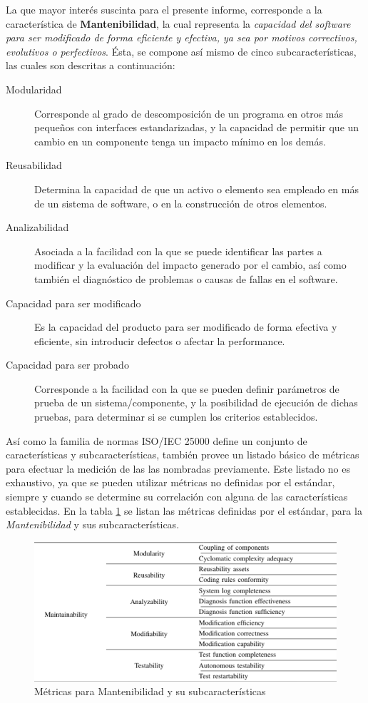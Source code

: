 La que mayor interés suscinta para el presente informe, corresponde a la característica
de \textbf{Mantenibilidad}, la cual representa la \textit{capacidad del software para ser modificado
de forma eficiente y efectiva, ya sea por motivos correctivos, evolutivos o perfectivos}.
Ésta, se compone así mismo de cinco subcaracterísticas, las cuales son descritas
a continuación:
\begin{description}
    \item [Modularidad] Corresponde al grado de descomposición de un programa en otros más pequeños
    con interfaces estandarizadas, y la capacidad de permitir que un cambio en un componente tenga
    un impacto mínimo en los demás.
    \item [Reusabilidad] Determina la capacidad de que un activo o elemento sea empleado en más
    de un sistema de software, o en la construcción de otros elementos.
    \item [Analizabilidad] Asociada a la facilidad con la que se puede identificar las partes
    a modificar y la evaluación del impacto generado por el cambio, así como también el diagnóstico
    de problemas o causas de fallas en el software.
    \item [Capacidad para ser modificado] Es la capacidad del producto para ser modificado de
    forma efectiva y eficiente, sin introducir defectos o afectar la performance.
    \item [Capacidad para ser probado] Corresponde a la facilidad con la que se pueden definir
    parámetros de prueba de un sistema/componente, y la posibilidad de ejecución de dichas pruebas,
    para determinar si se cumplen los criterios establecidos.
\end{description}

Así como la familia de normas ISO/IEC 25000 define un conjunto de características y
subcaracterísticas, también provee un listado básico de métricas para efectuar la
medición de las las nombradas previamente.
Este listado no es exhaustivo, ya que se pueden utilizar métricas no definidas por el
estándar, siempre y cuando se determine su correlación con alguna de las características
establecidas.
En la tabla \ref{Metrics} se listan las métricas definidas por el estándar, para la \textit{Mantenibilidad}
y sus subcaracterísticas.

\begin{figure}[H]
    \label{Metrics}
    \includegraphics[width=12cm]{quality_metrics/quality_metrics.png}
    \centering
    \caption{Métricas para Mantenibilidad y su subcaracterísticas}
\end{figure}

